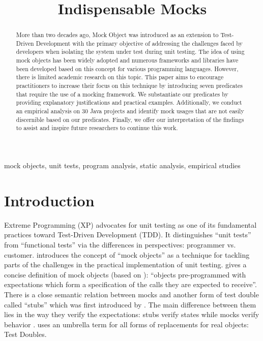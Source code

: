 \documentclass[conference]{IEEEtran}
\begin{document}
\title{Indispensable Mocks}

\author{
}

\maketitle

\begin{abstract}
More than two decades ago, Mock Object was introduced as an extension to Test-Driven Development with the primary objective of addressing the challenges faced by developers when isolating the system under test during unit testing. The idea of using mock objects has been widely adopted and numerous frameworks and libraries have been developed based on this concept for various programming languages. However, there is limited academic research on this topic. This paper aims to encourage practitioners to increase their focus on this technique by introducing seven predicates that require the use of a mocking framework. We substantiate our predicates by providing explanatory justifications and practical examples. Additionally, we conduct an empirical analysis on 30 Java projects and identify mock usages that are not easily discernible based on our predicates. Finally, we offer our interpretation of the findings to assist and inspire future researchers to continue this work.
\end{abstract}

\begin{IEEEkeywords}
mock objects, unit tests, program analysis, static analysis, empirical studies
\end{IEEEkeywords}

\section{Introduction}
Extreme Programming (XP) \cite{beck2000extreme} advocates for unit testing as one of its fundamental practices toward Test-Driven Development (TDD). It distinguishes ``unit tests'' from ``functional tests'' via the differences in perspectives: programmer vs. customer. \cite{endotesting} introduces the concept of ``mock objects'' as a technique for tackling parts of the challenges in the practical implementation of unit testing. \cite{mockarentstubs} gives a concise definition of mock objects (based on \cite{meszaros2007xunit}): ``objects pre-programmed with expectations which form a specification of the calls they are expected to receive''. There is a close semantic relation between mocks and another form of test double called ``stubs'' which was first introduced by \cite{binder99testingoo}. The main difference between them lies in the way they verify the expectations: stubs verify states while mocks verify behavior \cite{mockarentstubs}. \cite{meszaros2007xunit} uses an umbrella term for all forms of replacements for real objects: Test Doubles. 
\end{document}
